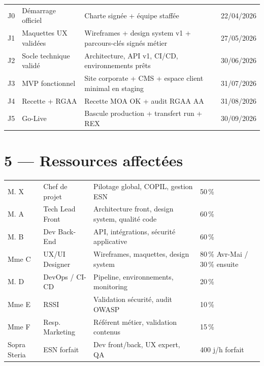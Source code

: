 \documentclass[11pt,a4paper,oneside]{report}
\begin{document}
\renewcommand{\arraystretch}{1.3}
\begin{tabularx}{\textwidth}{C{1.5cm} L{5.5cm} Y C{2.5cm}}
\toprule
{} &  &  &  \\
\midrule
J0 & Démarrage officiel       & Charte signée + équipe staffée    & 22/04/2026 \\
J1 & Maquettes UX validées    & Wireframes + design system v1 + parcours-clés signés métier & 27/05/2026 \\
J2 & Socle technique validé   & Architecture, API v1, CI/CD, environnements prêts & 30/06/2026 \\
J3 & MVP fonctionnel          & Site corporate + CMS + espace client minimal en staging & 31/07/2026 \\
J4 & Recette + RGAA           & Recette MOA OK + audit RGAA AA & 31/08/2026 \\
J5 & Go-Live                  & Bascule production + transfert run + REX & 30/09/2026 \\
\bottomrule
\end{tabularx}

\section*{5 --- Ressources affectées}

\renewcommand{\arraystretch}{1.3}
\begin{tabularx}{\textwidth}{L{4cm} L{3.5cm} Y C{2.5cm}}
\toprule
{} &  &  &  \\
\midrule
M. X            & Chef de projet      & Pilotage global, COPIL, gestion ESN & 50\,\% \\
M. A           & Tech Lead Front     & Architecture front, design system, qualité code & 60\,\% \\
M. B             & Dev Back-End        & API, intégrations, sécurité applicative & 60\,\% \\
Mme C          & UX/UI Designer      & Wireframes, maquettes, design system & 80\,\% Avr-Mai / 30\,\% ensuite \\
M. D            & DevOps / CI-CD      & Pipeline, environnements, monitoring & 20\,\% \\
Mme E           & RSSI                & Validation sécurité, audit OWASP & 10\,\% \\
Mme F             & Resp. Marketing     & Référent métier, validation contenus & 15\,\% \\
Sopra Steria         & ESN forfait         & Dev front/back, UX expert, QA & 400 j/h forfait \\
\bottomrule
\end{tabularx}
\end{document}
